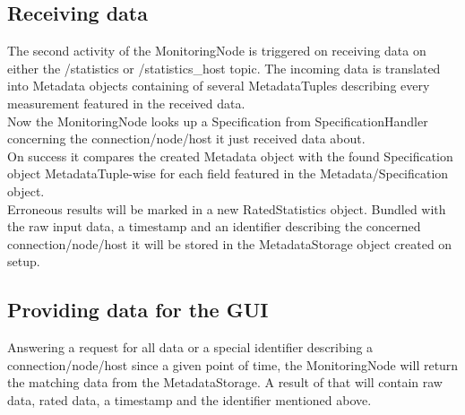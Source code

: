 \subsection*{Receiving data}
The second activity of the MonitoringNode is triggered on receiving data on either the /statistics or /statistics\_host topic. The incoming data is translated into Metadata objects containing of several MetadataTuples describing every measurement featured in the received data.\\
Now the MonitoringNode looks up a Specification from SpecificationHandler concerning the connection/node/host it just received data about.\\
On success it compares the created Metadata object with the found Specification object MetadataTuple-wise for each field featured in the Metadata/Specification object.\\
Erroneous results will be marked in a new RatedStatistics object. Bundled with the raw input data, a timestamp and an identifier describing the concerned connection/node/host it will be stored in the MetadataStorage object created on setup.

\subsection*{Providing data for the GUI}
Answering a request for all data or a special identifier describing a connection/node/host since a given point of time, the MonitoringNode will return the matching data from the MetadataStorage.
A result of that will contain raw data, rated data, a timestamp and the identifier mentioned above.
 
\newpage 
